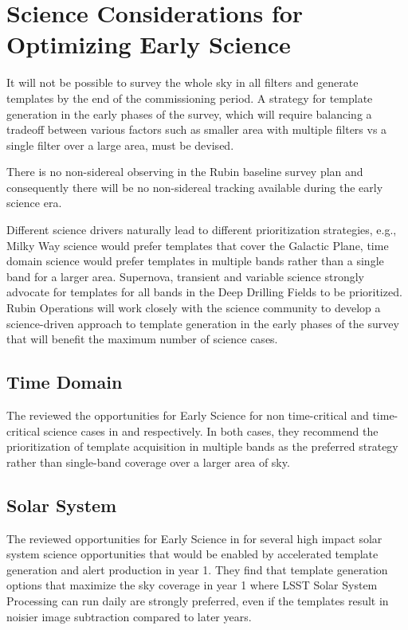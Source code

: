 \section{Science Considerations for Optimizing Early Science} \label{sec:science}

It will not be possible to survey the whole sky in all filters and generate templates by the end of the commissioning period.
A strategy for template generation in the early phases of the survey, which will require balancing a tradeoff between various factors such as smaller area with multiple filters vs a single filter over a large area, must be devised.

There is no non-sidereal observing in the Rubin baseline survey plan and consequently there  will be no non-sidereal tracking available during the early science era.

Different science drivers naturally lead to different prioritization strategies, e.g., Milky Way science would prefer templates that cover the Galactic Plane, time domain science would prefer templates in multiple bands rather than a single band for a larger area.
Supernova, transient and variable science strongly advocate for templates for all bands in the Deep Drilling Fields to be prioritized.
Rubin Operations will work closely with the science community to develop a science-driven approach to template generation in the early phases of the survey that will benefit the maximum number of science cases.


\subsection{Time Domain}

The \tvssc reviewed the opportunities for Early Science  for non time-critical and time-critical science cases in \citet[][]{2020RNAAS...4...40H} and \citet[][]{2020RNAAS...4...41S} respectively.
In both cases, they recommend the prioritization of template acquisition in multiple bands as the preferred strategy rather than single-band  coverage over a larger area of sky.

\subsection{Solar System}

The \sssc reviewed opportunities for Early Science  in \citet[][]{2021RNAAS...5..143S} for several high impact solar system science opportunities that would be enabled by accelerated template generation and alert production in year 1.
They find that template generation options that maximize the sky coverage in year 1 where LSST Solar System Processing can run daily are strongly preferred, even if the templates result in noisier image subtraction compared to later years.


